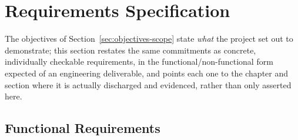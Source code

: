 \section{Requirements Specification}
\label{sec:requirements-specification}

The objectives of Section~\ref{sec:objectives-scope} state \emph{what} the project set out to demonstrate; this section restates the same commitments as concrete, individually checkable requirements, in the functional/non-functional form expected of an engineering deliverable, and points each one to the chapter and section where it is actually discharged and evidenced, rather than only asserted here.

\subsection{Functional Requirements}
\label{subsec:functional-requirements}

